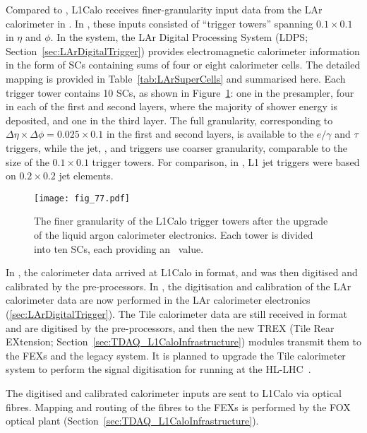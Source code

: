 \documentclass[cernpreprint, atlasdraft=false, UKenglish,british,orcidlogo, texmf, orcidlogo]{atlasdoc}
\begin{document}
Compared to \RunOneTwo, \gls{L1Calo} receives finer-granularity input data from the \gls{LAr} calorimeter in \RunThr.  In \RunOneTwo, these inputs consisted of ``trigger towers'' spanning $0.1 \times 0.1$ in $\eta$ and $\phi$.  In the \RunThr system, the \gls{LAr} Digital Processing System (\gls{LDPS}; Section~\ref{sec:LArDigitalTrigger}) provides electromagnetic calorimeter information in the form of \glspl{SC} containing sums of four or eight calorimeter cells.  The detailed mapping is provided in Table~\ref{tab:LArSuperCells} and summarised here. Each trigger tower contains 10 \glspl{SC}, as shown in Figure~\ref{fig:TDAQ_L1CaloSuperCell}: one in the presampler, four in each of the first and second layers, where the majority of shower energy is deposited, and one in the third layer.  The full granularity, corresponding to $\Delta\eta \times \Delta\phi = 0.025 \times 0.1$ in the first and second layers, is available to the $e/\gamma$ and $\tau$ triggers, while the jet, \ET, and \MET triggers use coarser granularity, comparable to the size of the $0.1 \times 0.1$ trigger towers.  For comparison, in \RunTwo, \gls{L1} jet triggers were based on $0.2 \times 0.2$ jet elements.
\begin{figure}[htbp]
\centerline{\texttt{[image: fig\_77.pdf]}}
\caption{The finer granularity of the \RunThr \gls{L1Calo} trigger towers after the upgrade of the liquid argon calorimeter electronics.  Each tower is divided into ten \glspl{SC}, each providing an \ET\ value.}
\label{fig:TDAQ_L1CaloSuperCell}
\end{figure}
 
In \RunOneTwo, the calorimeter data arrived at \gls{L1Calo} in \analog format, and was then digitised and calibrated by the pre-processors.  In \RunThr, the digitisation and calibration of the \gls{LAr} calorimeter data are now performed in the \gls{LAr} calorimeter electronics (\ref{sec:LArDigitalTrigger}).  The Tile calorimeter data are still received in \analog format and are digitised by the pre-processors, and then the new \gls{TREX} (Tile Rear EXtension; Section~\ref{sec:TDAQ_L1CaloInfrastructure}) modules transmit them to the \glspl{FEX} and the legacy system.  It is planned to upgrade the Tile calorimeter system to perform the signal digitisation for running at the \gls{HL-LHC}~\cite{ATLAS-TDR-28}.
 
The digitised and calibrated calorimeter inputs are sent to \gls{L1Calo} via optical fibres. Mapping and routing of the fibres to the \glspl{FEX} is performed by the \gls{FOX} optical plant (Section~\ref{sec:TDAQ_L1CaloInfrastructure}).
 
\end{document}
